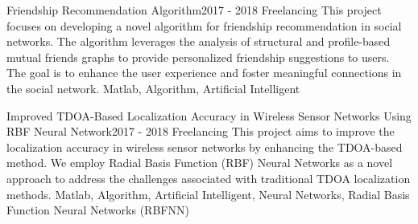 
\begin{projects}
	\project
	{Friendship Recommendation Algorithm}{2017 - 2018}
	{ {Freelancing} }
	{This project focuses on developing a novel algorithm for friendship recommendation in social networks. The algorithm leverages the analysis of structural and profile-based mutual friends graphs to provide personalized friendship suggestions to users. The goal is to enhance the user experience and foster meaningful connections in the social network.}
	{Matlab, Algorithm, Artificial Intelligent}
				
	\project
	{Improved TDOA-Based Localization Accuracy in Wireless Sensor Networks Using RBF Neural Network}{2017 - 2018}
	{ {Freelancing} }
	{This project aims to improve the localization accuracy in wireless sensor networks by enhancing the TDOA-based method. We employ Radial Basis Function (RBF) Neural Networks as a novel approach to address the challenges associated with traditional TDOA localization methods.}
	{Matlab, Algorithm, Artificial Intelligent, Neural Networks, Radial Basis Function Neural Networks (RBFNN)}

\end{projects}